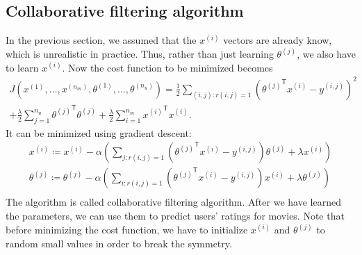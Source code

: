 \subsection{Collaborative filtering algorithm}
In the previous section, we assumed that the $x^{(i)}$ vectors are already know, which is unrealistic in practice. Thus, rather than just learning $\theta^{(j)}$, we also have to learn $x^{(i)}$. Now the cost function to be minimized becomes
\begin{equation}
\begin{split}
J(x^{(1)},\dots,x^{(n_m)},\theta^{(1)},\dots,\theta^{(n_u)}) = \frac{1}{2}
\sum\limits_{(i,j):r(i,j)=1}\left({\theta^{(j)}}^{\mathsf T}x^{(i)}-y^{(i,j)}\right)^2 \\+ \frac{\lambda}{2}\sum\limits_{j=1}^{n_u}{\theta^{(j)}}^{\mathsf T}\theta^{(j)} + \frac{\lambda}{2}\sum\limits_{i=1}^{n_m}{x^{(i)}}^{\mathsf T}x^{(i)}.
\end{split}\end{equation}
It can be minimized using gradient descent:
\begin{equation}
\begin{split}
x^{(i)}\coloneqq x^{(i)} - \alpha\left(\sum\limits_{j:r(i,j)=1}\left({\theta^{(j)}}^{\mathsf T}x^{(i)}-y^{(i,j)}\right)\theta^{(j)} + \lambda x^{(i)}\right)\\
\theta^{(j)}\coloneqq \theta^{(j)} - \alpha\left(\sum\limits_{i:r(i,j)=1}\left({\theta^{(j)}}^{\mathsf T}x^{(i)}-y^{(i,j)}\right)x^{(i)} + \lambda \theta^{(j)}\right)\\
\end{split}\end{equation}
The algorithm is called collaborative filtering algorithm. After we have learned the parameters, we can use them to predict users' ratings for movies. Note that before minimizing the cost function, we have to initialize $x^{(i)}$ and $\theta^{(j)}$ to random small values in order to break the symmetry.

